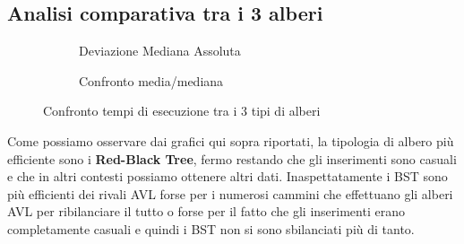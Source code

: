 \documentclass[a4paper,titlepage]{article}
\begin{document}
\subsection{Analisi comparativa tra i 3 alberi}

\begin{figure}[h]
  \centering
  \begin{subfigure}{\textwidth}
    \captionsetup{justification=centering}
     \caption{Deviazione Mediana Assoluta}
     \label{fig:bst_avl_rbt_median}
  \end{subfigure}%
  \vspace{2pt}
  \begin{subfigure}{\textwidth}
    \captionsetup{justification=centering}
    \caption{Confronto media/mediana}
     \label{fig:bst_avl_rbt_mean}
  \end{subfigure}
  \caption{Confronto tempi di esecuzione tra i 3 tipi di alberi}
\end{figure}

Come possiamo osservare dai grafici qui sopra riportati, la tipologia di albero più efficiente sono i \textbf{Red-Black Tree}, fermo restando che gli inserimenti sono casuali e che in altri contesti possiamo ottenere altri dati. Inaspettatamente i BST sono più efficienti dei rivali AVL forse per i numerosi cammini che effettuano gli alberi AVL per ribilanciare il tutto o forse per il fatto che gli inserimenti erano completamente casuali e quindi i BST non si sono sbilanciati più di tanto.
\newpage
\end{document}
